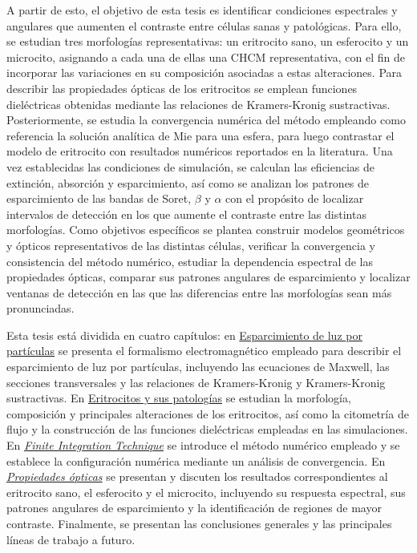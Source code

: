 A partir de esto, el objetivo de esta tesis es identificar condiciones espectrales y angulares que aumenten el contraste entre células sanas y patológicas.
Para ello, se estudian tres morfologías representativas: un eritrocito sano, un esferocito y un microcito, asignando a cada una de ellas una CHCM representativa, con el fin de incorporar las variaciones en su composición asociadas a estas alteraciones. Para describir las propiedades ópticas de los eritrocitos se emplean funciones dieléctricas obtenidas mediante las relaciones de Kramers-Kronig sustractivas. Posteriormente, se estudia la convergencia numérica del método empleando como referencia la solución analítica de Mie para una esfera, para luego contrastar el modelo de eritrocito con resultados numéricos reportados en la literatura. Una vez establecidas las condiciones de simulación, se calculan las eficiencias de extinción, absorción y esparcimiento, así como se analizan los patrones de esparcimiento de las bandas de Soret, $\beta$ y $\alpha$ con el propósito de localizar intervalos de detección en los que aumente el contraste entre las distintas morfologías. Como objetivos específicos se plantea construir modelos geométricos y ópticos representativos de las distintas células, verificar la convergencia y consistencia del método numérico, estudiar la dependencia espectral de las propiedades ópticas, comparar sus patrones angulares de esparcimiento y localizar ventanas de detección en las que las diferencias entre las morfologías sean más pronunciadas. 

Esta tesis está dividida en cuatro capítulos:  en \hyperref[chapter:theory]{Esparcimiento de luz por partículas} se presenta el formalismo electromagnético empleado para describir el esparcimiento de luz por partículas, incluyendo las ecuaciones de Maxwell, las secciones transversales y las relaciones de Kramers-Kronig y Kramers-Kronig sustractivas. En  \hyperref[chapter:eritrocitos]{Eritrocitos y sus patologías} se estudian la morfología, composición y principales alteraciones de los eritrocitos, así como la citometría de flujo y la construcción de las funciones dieléctricas empleadas en las simulaciones. En \hyperref[chapter:FIT]{\textit{Finite Integration Technique}} se introduce el método numérico empleado y se establece la configuración numérica mediante un análisis de convergencia. En \hyperref[chapter:Resultados]{\textit{Propiedades ópticas}} se presentan y discuten los resultados correspondientes al eritrocito sano, el esferocito y el microcito, incluyendo su respuesta espectral, sus patrones angulares de esparcimiento y la identificación de regiones de mayor contraste. Finalmente, se presentan las conclusiones generales y las principales líneas de trabajo a futuro.